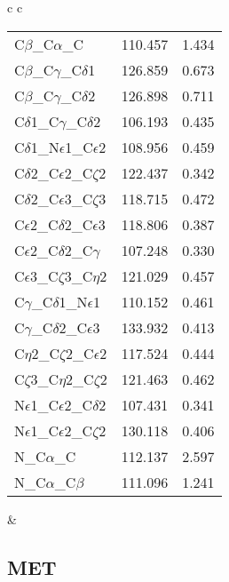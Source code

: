 \begin{longtable}{ c c }
\begin{tabular}{ l l l }
  C$\beta$\_C$\alpha$\_C & 110.457 & 1.434\\
  C$\beta$\_C$\gamma$\_C$\delta$1 & 126.859 & 0.673\\
  C$\beta$\_C$\gamma$\_C$\delta$2 & 126.898 & 0.711\\
  C$\delta$1\_C$\gamma$\_C$\delta$2 & 106.193 & 0.435\\
  C$\delta$1\_N$\epsilon$1\_C$\epsilon$2 & 108.956 & 0.459\\
  C$\delta$2\_C$\epsilon$2\_C$\zeta$2 & 122.437 & 0.342\\
  C$\delta$2\_C$\epsilon$3\_C$\zeta$3 & 118.715 & 0.472\\
  C$\epsilon$2\_C$\delta$2\_C$\epsilon$3 & 118.806 & 0.387\\
  C$\epsilon$2\_C$\delta$2\_C$\gamma$ & 107.248 & 0.330\\
  C$\epsilon$3\_C$\zeta$3\_C$\eta$2 & 121.029 & 0.457\\
  C$\gamma$\_C$\delta$1\_N$\epsilon$1 & 110.152 & 0.461\\
  C$\gamma$\_C$\delta$2\_C$\epsilon$3 & 133.932 & 0.413\\
  C$\eta$2\_C$\zeta$2\_C$\epsilon$2 & 117.524 & 0.444\\
  C$\zeta$3\_C$\eta$2\_C$\zeta$2 & 121.463 & 0.462\\
  N$\epsilon$1\_C$\epsilon$2\_C$\delta$2 & 107.431 & 0.341\\
  N$\epsilon$1\_C$\epsilon$2\_C$\zeta$2 & 130.118 & 0.406\\
  N\_C$\alpha$\_C & 112.137 & 2.597\\
  N\_C$\alpha$\_C$\beta$ & 111.096 & 1.241\\
  \bottomrule
  \end{tabular}
  &
  \\
  
\end{longtable}    

\newpage
\subsection{MET}

